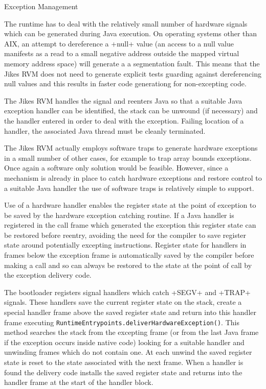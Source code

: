 \begin{section}{Exception Management}
\label{sec:exceptionmanagement}

The runtime has to deal with the relatively small number of hardware signals which can be generated during Java execution. On operating systems other than AIX, an attempt to dereference a \spverb+null+ value (an access to a null value manifests as a read to a small negative address outside the mapped virtual memory address space) will generate a a segmentation fault. This means that the Jikes RVM does not need to generate explicit tests guarding against dereferencing null values and this results in faster code generationg for non-excepting code.

The Jikes RVM handles the signal and reenters Java so that a suitable Java exception handler can be identified, the stack can be unwound (if necessary) and the handler entered in order to deal with the exception. Failing location of a handler, the associated Java thread must be cleanly terminated.

The Jikes RVM actually employs software traps to generate hardware exceptions in a small number of other cases, for example to trap array bounds exceptions. Once again a software only solution would be feasible. However, since a mechanism is already in place to catch hardware exceptions and restore control to a suitable Java handler the use of software traps is relatively simple to support.

Use of a hardware handler enables the register state at the point of exception to be saved by the hardware exception catching routine. If a Java handler is registered in the call frame which generated the exception this register state can be restored before reentry, avoiding the need for the compiler to save register state around potentially excepting instructions. Register state for handlers in frames below the exception frame is automatically saved by the compiler before making a call and so can always be restored to the state at the point of call by the exception delivery code.

The bootloader registers signal handlers which catch \spverb+SEGV+ and \spverb+TRAP+ signals. These handlers save the current register state on the stack, create a special handler frame above the saved register state and return into this handler frame executing \texttt{Run\-ti\-me\-En\-try\-points.de\-li\-ver\-Hard\-wa\-re\-Ex\-cep\-tion()}. This method searches the stack from the excepting frame (or from the last Java frame if the exception occurs inside native code) looking for a suitable handler and unwinding frames which do not contain one. At each unwind the saved register state is reset to the state associated with the next frame. When a handler is found the delivery code installs the saved register state and returns into the handler frame at the start of the handler block.


\end{section}
